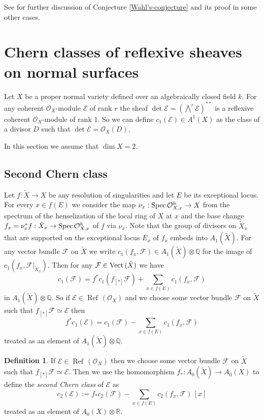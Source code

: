 \documentclass[twoside, 11pt]{article}
\theoremstyle{plain}
\theoremstyle{definition}
\newtheorem{Definition}[Thm]{Definition}
\theoremstyle{remark}
\newcommand{\QQ}{{\mathbb Q}}
\newcommand{\RR}{{\mathbb R}}
\newcommand{\cE}{{\mathcal E}}
\newcommand{\cF}{{\mathcal F}}
\newcommand{\cO}{{\mathcal O}}
\newcommand{\Refl}{{\mathop{\operatorname{Ref}\, }}}
\newcommand{\Spec}{{\mathop{{\rm Spec\, }}}}
\newcommand{\Vect}{{\mathop{{\rm Vect \,}}}}
\begin{document}
See \cite{La0} for further discussion of Conjecture \ref{Wahl's-conjecture} 
and its proof in some other cases.

\section{Chern classes of reflexive sheaves on normal surfaces}

Let $X$ be a proper normal variety defined over an algebraically closed field $k$.
For any coherent $\cO_X$-module $\cE$ of rank $r$ the sheaf $\det \cE =(\bigwedge ^r \cE)^{**}$ is 
a reflexive coherent $\cO_X$-module of rank $1$. So we can define $c_1(\cE)\in A^1(X)$ 
as the class of a divisor $D$ such that $\det \cE =\cO_X (D)$.  

In this section we assume that $\dim X=2$. 


\subsection{Second Chern class}\label{pullback}

Let  $f: \tilde X\to X$ be any resolution of singularities and 
let $E$ be its exceptional locus. For every $x\in f(E)$ we consider the map $\nu_x: \Spec \cO_{X,x}^h\to X$ from 
the spectrum of the henselization of the local ring of $X$ at $x$
and the base change $f_x=\nu_x^*f: \tilde X _x\to \Spec \cO_{X,x}^h$ of $f$ via $\nu_x$.
Note that the group of divisors on $\tilde X _x$ that are supported on
 the exceptional locus  $E_x$ of $f_x$ embeds into $A_1(\tilde X)$. For any vector bundle 
$\cF$ on $\tilde X$ we  write $c_1 (f_x, \cF)\in A_1(\tilde X)\otimes \QQ$ for the 
image  of $c_1 (f_x, \cF |_{ \tilde X _x})$.
Then for any $\cF\in \Vect (\tilde X)$  we have
$$c_1 (\cF)=f^*c_1 (f_{[*]} \cF)+\sum _{x\in f(E)}c_1 (f_x, \cF)$$
in $ A_1(\tilde X)\otimes \QQ$. So if $\cE\in \Refl(\cO_X) $ and  we choose some vector bundle $\cF$ on $\tilde X$ such that $f_{[*]}\cF\simeq \cE$ then
$$f^*c_1 (\cE)=c_1 (\cF)-\sum _{x\in f(E)} c_1 (f_x, \cF) $$ 
treated as an element of $ A_1(\tilde X)\otimes \QQ.$


\medskip

\begin{Definition}
If $\cE\in \Refl(\cO_X) $ then we choose some vector bundle $\cF$ on $\tilde X$ such that $f_{[*]}\cF\simeq \cE$.
Then we use  the homomorphism $f_*: A_0(\tilde X)\to A_0(X)$ to define the \emph{second Chern class} of $\cE$ as
$$c_2 (\cE):=f_*c_2 (\cF)-\sum _{x\in f(E)} c_2 (f_x, \cF) \, [x]$$ 
treated as an element of $ A_0(X)\otimes \RR.$
\end{Definition}
\end{document}
